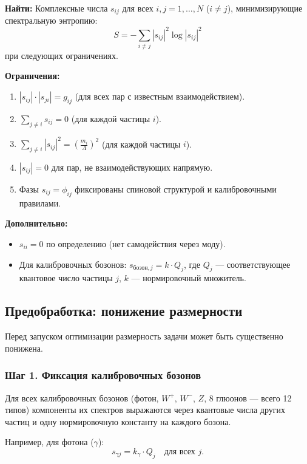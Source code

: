 \documentclass[12pt,a4paper]{article}
\begin{document}
\textbf{Найти:}
Комплексные числа $s_{ij}$ для всех $i, j = 1,\dots,N$ ($i \neq j$), минимизирующие спектральную энтропию:
\begin{equation}
    S = -\sum_{i \neq j} |s_{ij}|^2 \log|s_{ij}|^2
\end{equation}
при следующих ограничениях.

\textbf{Ограничения:}
\begin{enumerate}[label=(\arabic*)]
    \item $|s_{ij}| \cdot |s_{ji}| = g_{ij}$ \quad (для всех пар с известным взаимодействием).
    \item $\sum_{j \neq i} s_{ij} = 0$ \quad (для каждой частицы $i$).
    \item $\sum_{j \neq i} |s_{ij}|^2 = \left( \frac{m_i}{\Lambda} \right)^2$ \quad (для каждой частицы $i$).
    \item $|s_{ij}| = 0$ для пар, не взаимодействующих напрямую.
    \item Фазы $s_{ij} = \phi_{ij}$ фиксированы спиновой структурой и калибровочными правилами.
\end{enumerate}

\textbf{Дополнительно:}
\begin{itemize}
    \item $s_{ii} = 0$ по определению (нет самодействия через моду).
    \item Для калибровочных бозонов: $s_{\text{бозон}, j} = k \cdot Q_j$, где $Q_j$ --- соответствующее квантовое число частицы $j$, $k$ --- нормировочный множитель.
\end{itemize}

\subsection{Предобработка: понижение размерности}
Перед запуском оптимизации размерность задачи может быть существенно понижена.

\subsubsection{Шаг 1. Фиксация калибровочных бозонов}
Для всех калибровочных бозонов (фотон, $W^+$, $W^-$, $Z$, 8 глюонов --- всего 12 типов) компоненты их спектров выражаются через квантовые числа других частиц и одну нормировочную константу на каждого бозона.

Например, для фотона ($\gamma$):
\begin{equation}
    s_{\gamma j} = k_\gamma \cdot Q_j \quad \text{для всех } j.
\end{equation}
\end{document}
